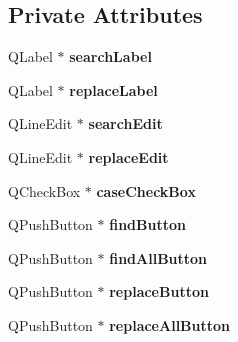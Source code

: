 \subsection*{Private Attributes}
\begin{DoxyCompactItemize}
\item 
\hypertarget{class_find_dialog_a162cc453e71d917ac08d1aabbdbf4fbd}{}Q\+Label $\ast$ {\bfseries search\+Label}\label{class_find_dialog_a162cc453e71d917ac08d1aabbdbf4fbd}

\item 
\hypertarget{class_find_dialog_aa29766ac87487026ac7a76951e4b8d0b}{}Q\+Label $\ast$ {\bfseries replace\+Label}\label{class_find_dialog_aa29766ac87487026ac7a76951e4b8d0b}

\item 
\hypertarget{class_find_dialog_ac516bb12976237f707d7b9c51738d73e}{}Q\+Line\+Edit $\ast$ {\bfseries search\+Edit}\label{class_find_dialog_ac516bb12976237f707d7b9c51738d73e}

\item 
\hypertarget{class_find_dialog_a343258a37f12d131051ad3cbdf353a28}{}Q\+Line\+Edit $\ast$ {\bfseries replace\+Edit}\label{class_find_dialog_a343258a37f12d131051ad3cbdf353a28}

\item 
\hypertarget{class_find_dialog_a35f7083798170a5d572fc9d869ca6d1a}{}Q\+Check\+Box $\ast$ {\bfseries case\+Check\+Box}\label{class_find_dialog_a35f7083798170a5d572fc9d869ca6d1a}

\item 
\hypertarget{class_find_dialog_a2a4e97929c23e98e150924d7420a481f}{}Q\+Push\+Button $\ast$ {\bfseries find\+Button}\label{class_find_dialog_a2a4e97929c23e98e150924d7420a481f}

\item 
\hypertarget{class_find_dialog_aa0bd8a47a2074da69056fbf812ea7811}{}Q\+Push\+Button $\ast$ {\bfseries find\+All\+Button}\label{class_find_dialog_aa0bd8a47a2074da69056fbf812ea7811}

\item 
\hypertarget{class_find_dialog_a671d60112b89dea510c149372d2992ef}{}Q\+Push\+Button $\ast$ {\bfseries replace\+Button}\label{class_find_dialog_a671d60112b89dea510c149372d2992ef}

\item 
\hypertarget{class_find_dialog_a558408ab812aebae4a63f805a3951023}{}Q\+Push\+Button $\ast$ {\bfseries replace\+All\+Button}\label{class_find_dialog_a558408ab812aebae4a63f805a3951023}


\end{DoxyCompactItemize}
